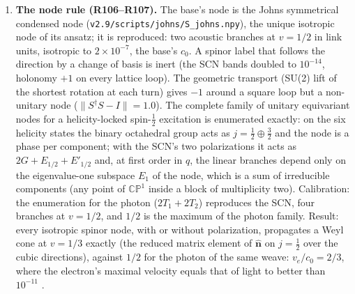 \documentclass[11pt,a4paper]{article}
\theoremstyle{plain}
\theoremstyle{remark}
\begin{document}
\begin{enumerate}[nosep]
The complex structure comes from one-way circulation ($J^2 = -1$, reversed by $T$), and the Pauli
algebra from the orientation of a circulating unit: with the SU(2) lift of R95,
$[\sigma_x/2, \sigma_y/2] = i\sigma_z/2$ is the composition law of orientation rotations. The
universal electron field is therefore the field of the medium's oriented one-way excitations (the
antiperiodic sector), not a mode of the weave; averaging the one-dimensional Weyl pair over unit
orientations gives $\langle(\boldsymbol\sigma\cdot\hat{\mathbf n})(\hat{\mathbf n}\cdot\mathbf p)\rangle
= \tfrac13\,\boldsymbol\sigma\cdot\mathbf p$: the Weyl form, at $c/3$.
\item \textbf{The node rule (R106--R107).} The base's node is the Johns symmetrical condensed node
\cite{johns} (\texttt{v2.9/scripts/johns/S\_johns.npy}), the unique isotropic node of its ansatz;
it is reproduced: two acoustic branches at $v = 1/2$ in link units, isotropic to $2\times10^{-7}$,
the base's $c_0$. A spinor label that follows the direction by a change of basis is inert (the SCN
bands doubled to $10^{-14}$, holonomy $+1$ on every lattice loop). The geometric transport (SU(2)
lift of the shortest rotation at each turn) gives $-1$ around a square loop but a non-unitary node
($\|S^\dagger S - I\| = 1.0$). The complete family of unitary equivariant nodes for a
helicity-locked spin-$\tfrac12$ excitation is enumerated exactly: on the six helicity states the
binary octahedral group acts as $j = \tfrac12 \oplus \tfrac32$ and the node is a phase per
component; with the SCN's two polarizations it acts as $2G + E_{1/2} + E'_{1/2}$ and, at first
order in $q$, the linear branches depend only on the eigenvalue-one subspace $E_1$ of the node,
which is a sum of irreducible components (any point of $\mathbb{CP}^1$ inside a block of
multiplicity two). Calibration: the enumeration for the photon ($2T_1 + 2T_2$) reproduces the SCN,
four branches at $v = 1/2$, and $1/2$ is the maximum of the photon family. Result: every isotropic
spinor node, with or without polarization, propagates a Weyl cone at $v = 1/3$ exactly (the
reduced matrix element of $\hat{\mathbf n}$ on $j = \tfrac12$ over the cubic directions), against
$1/2$ for the photon of the same weave: $v_e/c_0 = 2/3$, where the electron's maximal velocity
equals that of light to better than $10^{-11}$ \cite{hohensee}.
\end{enumerate}
\end{document}
